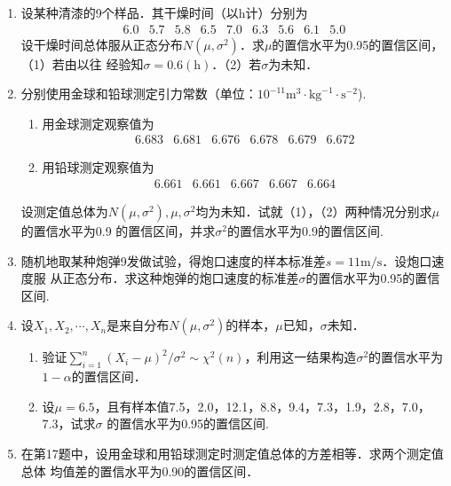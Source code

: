 \begin{enumerate}
    \item 设某种清漆的9个样品．其干燥时间（以h计）分别为
    $$\begin{array}{ccccccccc}
        6.0 & 5.7 & 5.8 & 6.5 & 7.0 & 6.3 & 5.6 & 6.1 & 5.0
    \end{array}$$
    设干燥时间总体服从正态分布$N(\mu,\sigma^2)$．求$\mu$的置信水平为0.95的置信区间，（1）若由以往
    经验知$\sigma=0.6(\mathrm{h})$．（2）若$\sigma$为未知．




    \item 分别使用金球和铅球测定引力常数（单位：$10^{-11}\mathrm{m}^3\cdot\mathrm{kg}^{-1}\cdot\mathrm{s}^{-2}$).
    \begin{enumerate}
        \item 用金球测定观察值为
        $$\begin{array}{cccccc}
            6.683 & 6.681 & 6.676 & 6.678 & 6.679 & 6.672
        \end{array}$$
        \item 用铅球测定观察值为
        $$\begin{array}{ccccc}
            6.661 & 6.661 & 6.667 & 6.667 & 6.664 
        \end{array}$$
    \end{enumerate}
    设测定值总体为$N(\mu,\sigma^2),\mu,\sigma^2$均为未知．试就（1），（2）两种情况分别求$\mu$的置信水平为0.9
    的置信区间，并求$\sigma^2$的置信水平为0.9的置信区间.




    \item 随机地取某种炮弹9发做试验，得炮口速度的样本标准差$s=11\mathrm{m}/\mathrm{s}$．设炮口速度服
    从正态分布．求这种炮弹的炮口速度的标准差$\sigma$的置信水平为0.95的置信区间.




    \item 设$X_1,X_2,\cdots,X_n$是来自分布$N(\mu,\sigma^2)$的样本，$\mu$已知，$\sigma$未知．
    \begin{enumerate}
        \item 验证$\displaystyle{\sum_{i=1}^n (X_i-\mu)^2/\sigma^2}\sim \chi^2(n)$，利用这一结果构造$\sigma^2$的置信水平为$1-\alpha$的置信区间．
        \item 设$\mu=6.5$，且有样本值7.5，2.0，12.1，8.8，9.4，7.3，1.9，2.8，7.0，7.3，试求$\sigma$
        的置信水平为0.95的置信区间.
    \end{enumerate}



    \item 在第17题中，设用金球和用铅球测定时测定值总体的方差相等．求两个测定值总体
    均值差的置信水平为0.90的置信区间．





\end{enumerate}
